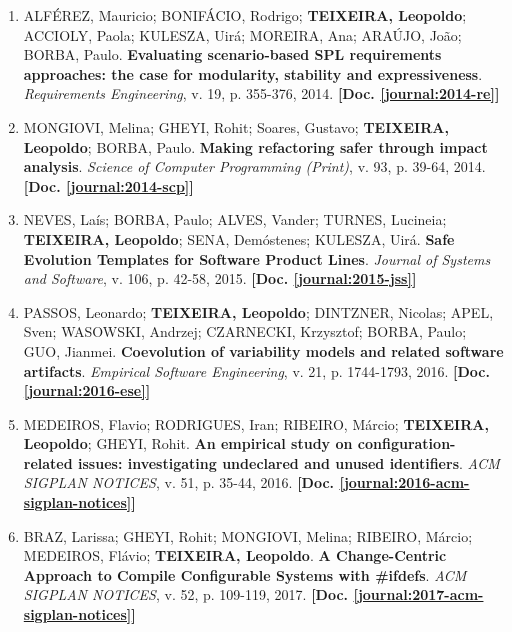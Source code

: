 \documentclass[a4paper,oneside,10pt]{article}
\begin{document}
\begin{enumerate}
\renewcommand{\labelenumi}{{\large\bfseries\arabic{enumi}.}}

\item ALFÉREZ, Mauricio; BONIFÁCIO, Rodrigo; \textbf{TEIXEIRA, Leopoldo}; ACCIOLY, Paola; KULESZA, Uirá; MOREIRA, Ana; ARAÚJO, João; BORBA, Paulo. \textbf{Evaluating scenario-based SPL requirements approaches: the case for modularity, stability and expressiveness}. \emph{Requirements Engineering}, v. 19, p. 355-376, 2014. \textbf{[Doc. \ref{journal:2014-re}]}

\item MONGIOVI, Melina; GHEYI, Rohit; Soares, Gustavo; \textbf{TEIXEIRA, Leopoldo}; BORBA, Paulo. \textbf{Making refactoring safer through impact analysis}. \emph{Science of Computer Programming (Print)}, v. 93, p. 39-64, 2014. \textbf{[Doc. \ref{journal:2014-scp}]}

\item NEVES, Laís; BORBA, Paulo; ALVES, Vander; TURNES, Lucineia; \textbf{TEIXEIRA, Leopoldo}; SENA, Demóstenes; KULESZA, Uirá. \textbf{Safe Evolution Templates for Software Product Lines}. \emph{Journal of Systems and Software}, v. 106, p. 42-58, 2015. \textbf{[Doc. \ref{journal:2015-jss}]}

\item PASSOS, Leonardo; \textbf{TEIXEIRA, Leopoldo}; DINTZNER, Nicolas; APEL, Sven; WASOWSKI, Andrzej; CZARNECKI, Krzysztof; BORBA, Paulo; GUO, Jianmei. \textbf{Coevolution of variability models and related software artifacts}. \emph{Empirical Software Engineering}, v. 21, p. 1744-1793, 2016. \textbf{[Doc. \ref{journal:2016-ese}]}
%

\item MEDEIROS, Flavio; RODRIGUES, Iran; RIBEIRO, Márcio; \textbf{TEIXEIRA, Leopoldo}; GHEYI, Rohit. \textbf{An empirical study on configuration-related issues: investigating undeclared and unused identifiers}. \emph{ACM SIGPLAN NOTICES}, v. 51, p. 35-44, 2016. \textbf{[Doc. \ref{journal:2016-acm-sigplan-notices}]}

\item BRAZ, Larissa; GHEYI, Rohit; MONGIOVI, Melina; RIBEIRO, Márcio; MEDEIROS, Flávio; \textbf{TEIXEIRA, Leopoldo}. \textbf{A Change-Centric Approach to Compile Configurable Systems with \#ifdefs}. \emph{ACM SIGPLAN NOTICES}, v. 52, p. 109-119, 2017. \textbf{[Doc. \ref{journal:2017-acm-sigplan-notices}]}

\end{enumerate}
\end{document}

